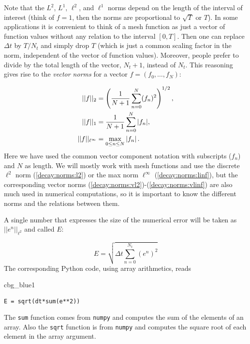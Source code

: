 \documentclass[%
oneside,                 %
final,                   %
10pt]{article}
\newenvironment{_cod_tight}[1]{
   \def\FrameCommand{\colorbox{#1}}
   \FrameRule0.6pt\MakeFramed {\FrameRestore}\vskip3mm}
   {\vskip0mm\endMakeFramed}
\newenvironment{cod}[1]{
\bgroup\rmfamily
\fboxsep=0mm\relax
\begin{_cod_tight}{#1}
\list{}{\parsep=-2mm\parskip=0mm\topsep=0pt\leftmargin=2mm
\rightmargin=2\leftmargin\leftmargin=4pt\relax}
\item\relax}
{\endlist\end{_cod_tight}\egroup}
\begin{document}
Note that the $L^2$, $L^1$, $\ell^2$, and $\ell^1$ norms depend on the
length of the interval of interest (think of $f=1$, then the
norms are proportional to $\sqrt{T}$ or $T$). In some applications it
is convenient to think of a mesh function as just a vector of function
values without any relation to the interval $[0,T]$.
Then one can replace $\Delta t$ by $T/N_t$ and simply drop $T$ (which
is just a common scaling factor in the norm,
independent of the vector of function
values). Moreover, people prefer
to divide by the total length of the vector, $N_t+1$, instead of $N_t$.
This reasoning gives rise to the \emph{vector norms} for a vector
$f=(f_0,\ldots,f_{N})$:

\begin{align}
||f||_2 &= \left( \frac{1}{N+1}\sum_{n=0}^{N} (f_n)^2\right)^{1/2},
\label{decay:norms:vl2}\\ 
||f||_1 &= \frac{1}{N+1}\sum_{n=0}^{N} |f_n|,
\label{decay:norms:vl1}\\ 
||f||_{\ell^\infty} &= \max_{0\leq n\leq N}|f_n|\thinspace .
\label{decay:norms:vlinf}
\end{align}
Here we have used the common vector component notation with subscripts
($f_n$) and $N$ as length. We will mostly work with mesh functions
and use the discrete $\ell^2$
norm (\ref{decay:norms:l2}) or the max norm $\ell^\infty$
(\ref{decay:norms:linf}), but the corresponding vector norms
(\ref{decay:norms:vl2})-(\ref{decay:norms:vlinf}) are also much used
in numerical computations, so it is important to know the different
norms and the relations between them.


A single number that expresses the size of the numerical error
will be taken as $||e^n||_{\ell^2}$ and called $E$:

\begin{equation}
E = \sqrt{\Delta t\sum_{n=0}^{N_t} (e^n)^2}
\label{decay:E}
\end{equation}
The corresponding Python code, using array arithmetics, reads

\begin{cod}{cbg_blue1}\begin{Verbatim}[numbers=none,fontsize=\fontsize{9pt}{9pt},baselinestretch=0.95,xleftmargin=2mm]
E = sqrt(dt*sum(e**2))
\end{Verbatim}
\end{cod}
\noindent
The \texttt{sum} function comes from \texttt{numpy} and computes the sum of the elements
of an array. Also the \texttt{sqrt} function is from \texttt{numpy} and computes the
square root of each element in the array argument.
\end{document}

